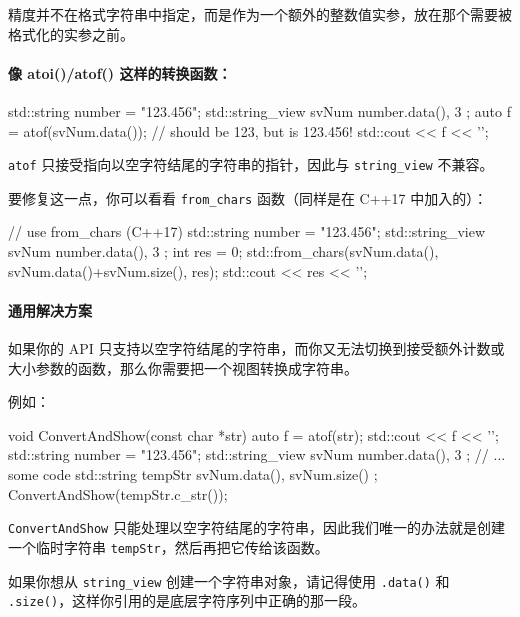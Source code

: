
精度并不在格式字符串中指定，而是作为一个额外的整数值实参，放在那个需要被格式化的实参之前。

\paragraph{像 atoi()/atof() 这样的转换函数：}

\begin{codebox}[cpp]
std::string number = "123.456";
std::string_view svNum { number.data(), 3 };
auto f = atof(svNum.data()); // should be 123, but is 123.456!
std::cout << f << '\n';
\end{codebox}

\texttt{atof} 只接受指向以空字符结尾的字符串的指针，因此与 \texttt{string\_view} 不兼容。

要修复这一点，你可以看看 \texttt{from\_chars} 函数（同样是在 C++17 中加入的）：

\begin{codebox}[cpp]
// use from_chars (C++17)
std::string number = "123.456";
std::string_view svNum { number.data(), 3 };
int res = 0;
std::from_chars(svNum.data(), svNum.data()+svNum.size(), res);
std::cout << res << '\n';
\end{codebox}

\paragraph{通用解决方案}

如果你的 API 只支持以空字符结尾的字符串，而你又无法切换到接受额外计数或大小参数的函数，那么你需要把一个视图转换成字符串。

例如：

\begin{codebox}[cpp]
void ConvertAndShow(const char *str)
{
auto f = atof(str);
std::cout << f << '\n';
}
std::string number = "123.456";
std::string_view svNum { number.data(), 3 };
// ... some code
std::string tempStr { svNum.data(), svNum.size() };
ConvertAndShow(tempStr.c_str());
\end{codebox}

\texttt{ConvertAndShow} 只能处理以空字符结尾的字符串，因此我们唯一的办法就是创建一个临时字符串 \texttt{tempStr}，然后再把它传给该函数。

如果你想从 \texttt{string\_view} 创建一个字符串对象，请记得使用 \texttt{.data()} 和 \texttt{.size()}，这样你引用的是底层字符序列中正确的那一段。

